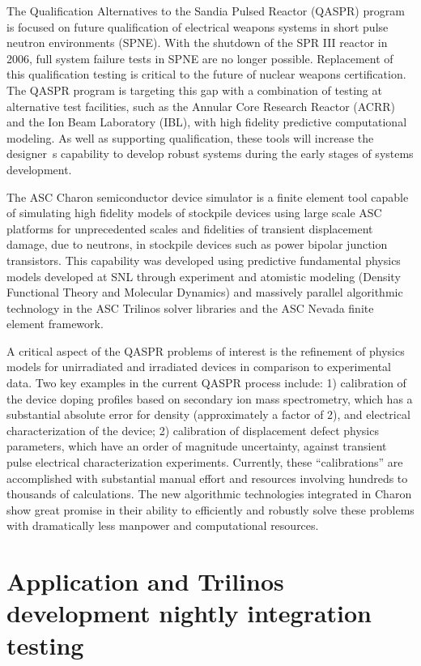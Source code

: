 \documentclass[pdf,ps2pdf,11pt]{SANDreport}
\begin{document}
The Qualification Alternatives to the Sandia Pulsed Reactor (QASPR) program is
focused on future qualification of electrical weapons systems in short pulse
neutron environments (SPNE).  With the shutdown of the SPR III reactor in
2006, full system failure tests in SPNE are no longer possible.  Replacement
of this qualification testing is critical to the future of nuclear weapons
certification.  The QASPR program is targeting this gap with a combination of
testing at alternative test facilities, such as the Annular Core Research
Reactor (ACRR) and the Ion Beam Laboratory (IBL), with high fidelity
predictive computational modeling.  As well as supporting qualification, these
tools will increase the designer~s capability to develop robust systems during
the early stages of systems development.

The ASC Charon semiconductor device simulator is a finite element tool capable
of simulating high fidelity models of stockpile devices using large scale ASC
platforms for unprecedented scales and fidelities of transient displacement
damage, due to neutrons, in stockpile devices such as power bipolar junction
transistors.  This capability was developed using predictive fundamental
physics models developed at SNL through experiment and atomistic modeling
(Density Functional Theory and Molecular Dynamics) and massively parallel
algorithmic technology in the ASC Trilinos solver libraries and the ASC Nevada
finite element framework.

A critical aspect of the QASPR problems of interest is the refinement of
physics models for unirradiated and irradiated devices in comparison to
experimental data.  Two key examples in the current QASPR process include: 1)
calibration of the device doping profiles based on secondary ion mass
spectrometry, which has a substantial absolute error for density
(approximately a factor of 2), and electrical characterization of the device;
2) calibration of displacement defect physics parameters, which have an order
of magnitude uncertainty, against transient pulse electrical characterization
experiments.  Currently, these ``calibrations'' are accomplished with
substantial manual effort and resources involving hundreds to thousands of
calculations.  The new algorithmic technologies integrated in Charon show
great promise in their ability to efficiently and robustly solve these
problems with dramatically less manpower and computational resources.

%
\section{Application and Trilinos development nightly integration testing}
%
\end{document}
